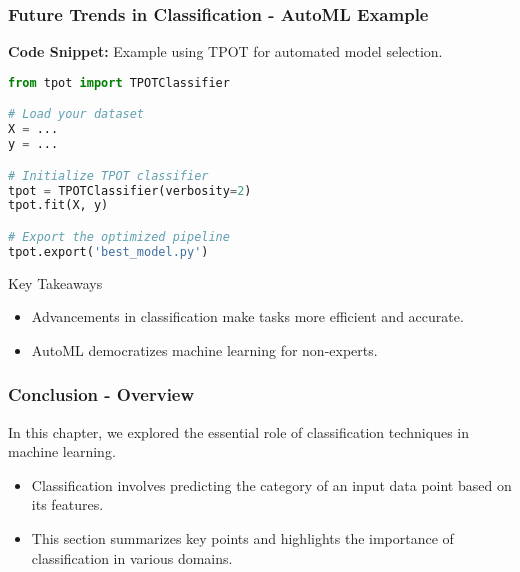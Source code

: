 \documentclass[aspectratio=169]{beamer}
\begin{document}
\begin{frame}[fragile]
    \frametitle{Future Trends in Classification - AutoML Example}
    \textbf{Code Snippet:} Example using TPOT for automated model selection.
    \begin{lstlisting}[language=Python]
from tpot import TPOTClassifier

# Load your dataset
X = ...
y = ...

# Initialize TPOT classifier
tpot = TPOTClassifier(verbosity=2)
tpot.fit(X, y)

# Export the optimized pipeline
tpot.export('best_model.py')
    \end{lstlisting}

    \begin{block}{Key Takeaways}
        \begin{itemize}
            \item Advancements in classification make tasks more efficient and accurate.
            \item AutoML democratizes machine learning for non-experts.
        \end{itemize}
    \end{block}
\end{frame}

\begin{frame}[fragile]
    \frametitle{Conclusion - Overview}
    In this chapter, we explored the essential role of classification techniques in machine learning. 
    \begin{itemize}
        \item Classification involves predicting the category of an input data point based on its features.
        \item This section summarizes key points and highlights the importance of classification in various domains.
    \end{itemize}
\end{frame}
\end{document}
